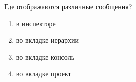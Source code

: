 
Где отображаются различные сообщения?

\begin{enumerate}
    \item в инспекторе
    \item во вкладке иерархии
    \item во вкладке консоль
    \item во вкладке проект
\end{enumerate}